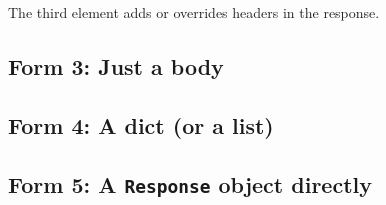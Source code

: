 \noindent{}The third element adds or overrides headers in the response.

\subsection*{Form 3: Just a body}\label{34-response-handling:form-3-just-a-body}

\begin{codebox}[short]

\begin{Shaded}
\begin{Highlighting}[]
\NormalTok{: }\NormalTok{\})}
\end{Highlighting}
\end{Shaded}

\end{codebox}

\subsection*{Form 4: A dict (or a list)}\label{34-response-handling:form-4-a-dict-or-a-list}

\begin{codebox}[short]

\begin{Shaded}
\begin{Highlighting}[]
\NormalTok{ \{}\NormalTok{: }\NormalTok{\}}
\end{Highlighting}
\end{Shaded}

\end{codebox}

\subsection*{\texorpdfstring{Form 5: A \texttt{Response} object directly}{Form 5: A Response object directly}}\label{34-response-handling:form-5-a-response-object-directly}

